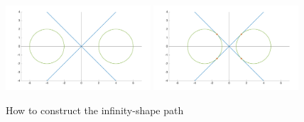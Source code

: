 \begin{figure}[!htbp]
  \centering
 {\includegraphics[width=0.48\textwidth]{img/constructionshape1_.png}\label{fig:constuctinfinity1}}
  \hfill
  {\includegraphics[width=0.48\textwidth]{img/constructionshape2_.png}\label{fig:constuctinfinity2}}
  \caption{How to construct the infinity-shape path}
\end{figure}

